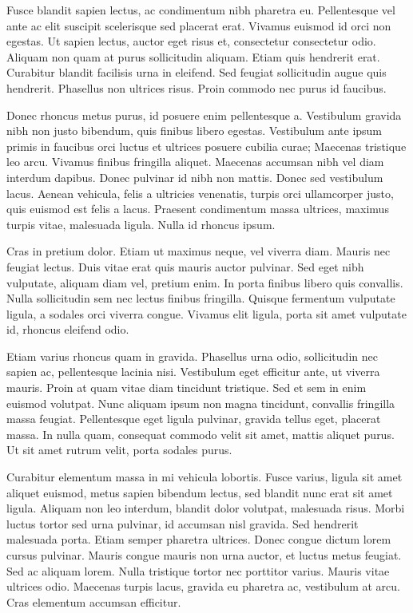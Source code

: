 \documentclass{article}
\begin{document}
Fusce blandit sapien lectus, ac condimentum nibh pharetra eu. Pellentesque vel ante ac elit suscipit scelerisque sed placerat erat. Vivamus euismod id orci non egestas. Ut sapien lectus, auctor eget risus et, consectetur consectetur odio. Aliquam non quam at purus sollicitudin aliquam. Etiam quis hendrerit erat. Curabitur blandit facilisis urna in eleifend. Sed feugiat sollicitudin augue quis hendrerit. Phasellus non ultrices risus. Proin commodo nec purus id faucibus.

Donec rhoncus metus purus, id posuere enim pellentesque a. Vestibulum gravida nibh non justo bibendum, quis finibus libero egestas. Vestibulum ante ipsum primis in faucibus orci luctus et ultrices posuere cubilia curae; Maecenas tristique leo arcu. Vivamus finibus fringilla aliquet. Maecenas accumsan nibh vel diam interdum dapibus. Donec pulvinar id nibh non mattis. Donec sed vestibulum lacus. Aenean vehicula, felis a ultricies venenatis, turpis orci ullamcorper justo, quis euismod est felis a lacus. Praesent condimentum massa ultrices, maximus turpis vitae, malesuada ligula. Nulla id rhoncus ipsum.

Cras in pretium dolor. Etiam ut maximus neque, vel viverra diam. Mauris nec feugiat lectus. Duis vitae erat quis mauris auctor pulvinar. Sed eget nibh vulputate, aliquam diam vel, pretium enim. In porta finibus libero quis convallis. Nulla sollicitudin sem nec lectus finibus fringilla. Quisque fermentum vulputate ligula, a sodales orci viverra congue. Vivamus elit ligula, porta sit amet vulputate id, rhoncus eleifend odio.

Etiam varius rhoncus quam in gravida. Phasellus urna odio, sollicitudin nec sapien ac, pellentesque lacinia nisi. Vestibulum eget efficitur ante, ut viverra mauris. Proin at quam vitae diam tincidunt tristique. Sed et sem in enim euismod volutpat. Nunc aliquam ipsum non magna tincidunt, convallis fringilla massa feugiat. Pellentesque eget ligula pulvinar, gravida tellus eget, placerat massa. In nulla quam, consequat commodo velit sit amet, mattis aliquet purus. Ut sit amet rutrum velit, porta sodales purus.

Curabitur elementum massa in mi vehicula lobortis. Fusce varius, ligula sit amet aliquet euismod, metus sapien bibendum lectus, sed blandit nunc erat sit amet ligula. Aliquam non leo interdum, blandit dolor volutpat, malesuada risus. Morbi luctus tortor sed urna pulvinar, id accumsan nisl gravida. Sed hendrerit malesuada porta. Etiam semper pharetra ultrices. Donec congue dictum lorem cursus pulvinar. Mauris congue mauris non urna auctor, et luctus metus feugiat. Sed ac aliquam lorem. Nulla tristique tortor nec porttitor varius. Mauris vitae ultrices odio. Maecenas turpis lacus, gravida eu pharetra ac, vestibulum at arcu. Cras elementum accumsan efficitur.
\end{document}
